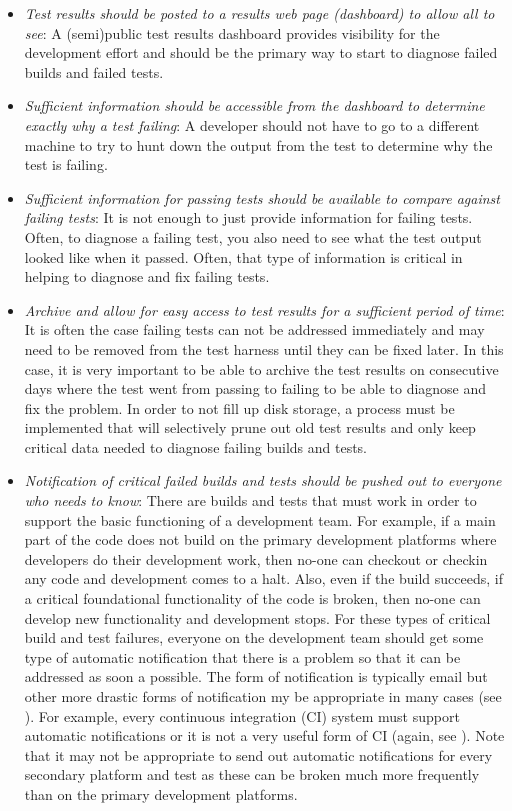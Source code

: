 \documentclass[pdf,ps2pdf,11pt]{SANDreport}
\begin{document}
\begin{itemize}

{}\item\textit{Test results should be posted to a results web page
(dashboard) to allow all to see}: A (semi)public test results
dashboard provides visibility for the development effort and should be
the primary way to start to diagnose failed builds and failed tests.

{}\item\textit{Sufficient information should be accessible from the
dashboard to determine exactly why a test failing}: A developer should
not have to go to a different machine to try to hunt down the output
from the test to determine why the test is failing.

{}\item\textit{Sufficient information for passing tests should be
available to compare against failing tests}: It is not enough to just
provide information for failing tests.  Often, to diagnose a failing
test, you also need to see what the test output looked like when it
passed.  Often, that type of information is critical in helping to
diagnose and fix failing tests.

{}\item\textit{Archive and allow for easy access to test results for a
sufficient period of time}: It is often the case failing tests can not
be addressed immediately and may need to be removed from the test
harness until they can be fixed later.  In this case, it is very
important to be able to archive the test results on consecutive days
where the test went from passing to failing to be able to diagnose and
fix the problem.  In order to not fill up disk storage, a process must
be implemented that will selectively prune out old test results and
only keep critical data needed to diagnose failing builds and tests.

{}\item\textit{Notification of critical failed builds and tests should
be pushed out to everyone who needs to know}: There are builds and
tests that must work in order to support the basic functioning of a
development team.  For example, if a main part of the code does not
build on the primary development platforms where developers do their
development work, then no-one can checkout or checkin any code and
development comes to a halt.  Also, even if the build succeeds, if a
critical foundational functionality of the code is broken, then no-one
can develop new functionality and development stops.  For these types
of critical build and test failures, everyone on the development team
should get some type of automatic notification that there is a problem
so that it can be addressed as soon a possible.  The form of
notification is typically email but other more drastic forms of
notification my be appropriate in many cases (see
{}\cite{book:continuous-integration}).  For example, every continuous
integration (CI) system must support automatic notifications or it is
not a very useful form of CI (again, see
{}\cite{book:continuous-integration}).  Note that it may not be
appropriate to send out automatic notifications for every secondary
platform and test as these can be broken much more frequently than on
the primary development platforms.
  

\end{itemize}
\end{document}
